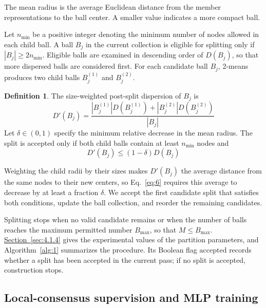 \documentclass[10pt,letterpaper,nopreprintline]{elsarticle}
\theoremstyle{definition}
\newtheorem{definition}{Definition}
\theoremstyle{plain}
\begin{document}
The mean radius is the average Euclidean distance from the member representations to the ball center. A smaller value indicates a more compact ball.

\Needspace{64pt}

Let \(n_{\min}\) be a positive integer denoting the minimum number of nodes allowed in each child ball. A ball \(B_j\) in the current collection is eligible for splitting only if \(|B_j|\geq 2n_{\min}\). Eligible balls are examined in descending order of \(D(B_j)\), so that more dispersed balls are considered first. For each candidate ball \(B_j\), 2-means produces two child balls \(B_j^{(1)}\) and \(B_j^{(2)}\).

\begin{definition}
The size-weighted post-split dispersion of \(B_j\) is
\begin{equation}\label{eq:5}
D'(B_j) = \frac{|B_j^{(1)}|D(B_j^{(1)}) + |B_j^{(2)}|D(B_j^{(2)})}{|B_j|}
\end{equation}
Let \(\delta \in (0,1)\) specify the minimum relative decrease in the mean radius. The split is accepted only if both child balls contain at least \(n_{\min}\) nodes and
\begin{equation}\label{eq:6}
D'(B_j) \leq (1 - \delta)D(B_j)
\end{equation}
\end{definition}

Weighting the child radii by their sizes makes \(D'(B_j)\) the average distance from the same nodes to their new centers, so Eq.~\eqref{eq:6} requires this average to decrease by at least a fraction \(\delta\). We accept the first candidate split that satisfies both conditions, update the ball collection, and reorder the remaining candidates.

Splitting stops when no valid candidate remains or when the number of balls reaches the maximum permitted number \(B_{\max}\), so that \(M\leq B_{\max}\). \hyperref[sec:4.1.4]{Section~\ref*{sec:4.1.4}} gives the experimental values of the partition parameters, and Algorithm~\ref{alg:1} summarizes the procedure. Its Boolean flag \(\mathrm{accepted}\) records whether a split has been accepted in the current pass; if no split is accepted, construction stops.



\subsection{Local-consensus supervision and MLP training}\label{sec:3.3}
\end{document}
